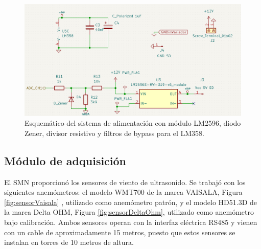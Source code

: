 \begin{figure}[H]
    \centering
    \includegraphics[width=0.8\linewidth]{Figuras/datalogger/Hardware/esquemPowerSupply.png}
    \caption{Esquemático del sistema de alimentación con módulo LM2596, diodo Zener, divisor resistivo y filtros de bypass para el LM358.}
    \label{fig:esquemPowerSupply}
\end{figure}

\subsection{Módulo de adquisición}\label{sec:moduloAdquisicionDatoViento}
El SMN proporcionó los sensores de viento de ultrasonido. Se trabajó con los siguientes anemómetros: el modelo WMT700 de la marca VAISALA, Figura \ref{fig:sensorVaisala}
, utilizado como anemómetro patrón, y el modelo HD51.3D de la marca Delta OHM, Figura \ref{fig:sensorDeltaOhm}, utilizado como anemómetro bajo calibración. Ambos sensores operan con la interfaz eléctrica RS485 y vienen con un cable de aproximadamente 15 metros, puesto que estos sensores se instalan en torres de 10 metros de altura.

